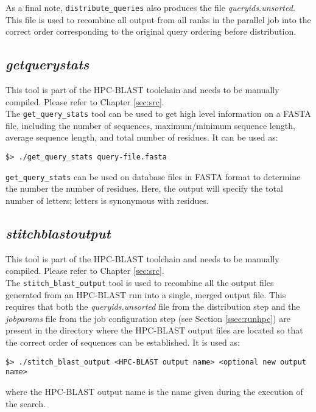 \documentclass[10pt]{article}
\begin{document}
As a final note, \verb^distribute_queries^ also produces the file \emph{query\textunderscore ids.unsorted}.  This file is used to recombine all output from all ranks in the parallel job into the correct order corresponding to the original query ordering before
distribution.

\subsection{\emph{get\textunderscore query\textunderscore stats}} \label{ssec:getqstats}

 This tool is part of the HPC-BLAST toolchain and needs to be manually compiled.  Please refer to Chapter \ref{sec:src}.\\

The \verb^get_query_stats^ tool can be used to get high level information on a FASTA file, including the number of sequences, maximum/minimum sequence length, average sequence length, and total number of residues.  It can be used as:
\begin{verbatim}
$> ./get_query_stats query-file.fasta
\end{verbatim}

 \verb^get_query_stats^ can be used on database files in FASTA format to determine the number the number of residues. Here, the output will specify the total number of letters; letters is synonymous with residues.

\subsection{\emph{stitch\textunderscore blast\textunderscore output}} \label{ssec:stitch}

 This tool is part of the HPC-BLAST toolchain and needs to be manually compiled.  Please refer to Chapter \ref{sec:src}.\\

The \verb^stitch_blast_output^ tool is used to recombine all the output files generated from an HPC-BLAST run into a single, merged output file.  This requires that both the \emph{query\textunderscore ids.unsorted} file from the distribution step and the
\emph{job\textunderscore params} file from the job configuration step (see Section \ref{ssec:runhpc}) are present in the directory where the HPC-BLAST
output files are located so that the correct order of sequences can be established.  It is used as:
\begin{verbatim}
$> ./stitch_blast_output <HPC-BLAST output name> <optional new output name>
\end{verbatim}
\noindent where the HPC-BLAST output name is the name given during the execution of the search.\\
\end{document}
